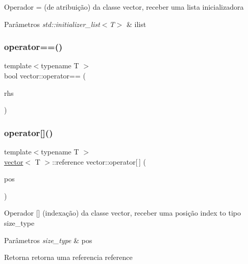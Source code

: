 Operador = (de atribuição) da classe vector, receber uma lista inicializadora 
\begin{DoxyParams}{Parâmetros}
{\em std\+::initializer\+\_\+list$<$\+T$>$} & ilist \\
\hline
\end{DoxyParams}
\mbox{\label{classsc_1_1vector_a764f351207d5e530d8e9e936b972f290}} 
\subsubsection{\texorpdfstring{operator==()}{operator==()}}
{\footnotesize\ttfamily template$<$typename T $>$ \\
bool vector\+::operator== (\begin{DoxyParamCaption}\item[{const \mbox{\hyperlink{classsc_1_1vector}{vector}}$<$ T $>$ \&}]{rhs }\end{DoxyParamCaption})}

\mbox{\label{classsc_1_1vector_a6aa5376ac0bca60a4ef154095733591c}} 
\subsubsection{\texorpdfstring{operator[]()}{operator[]()}}
{\footnotesize\ttfamily template$<$typename T $>$ \\
\mbox{\hyperlink{classsc_1_1vector}{vector}}$<$ T $>$\+::reference vector\+::operator\mbox{[}$\,$\mbox{]} (\begin{DoxyParamCaption}\item[{size\+\_\+type}]{pos }\end{DoxyParamCaption})}

Operador \mbox{[}\mbox{]} (indexação) da classe vector, receber uma posição index to tipo size\+\_\+type 
\begin{DoxyParams}{Parâmetros}
{\em size\+\_\+type} & pos \\
\hline
\end{DoxyParams}
\begin{DoxyReturn}{Retorna}
retorna uma referencia reference 
\end{DoxyReturn}
\mbox{\label{classsc_1_1vector_a1d32a5d62fa75707a4a6a5781e1030ea}} 
